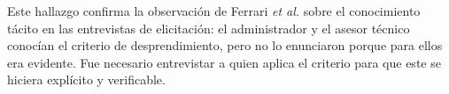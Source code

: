 Este hallazgo confirma la observación de Ferrari \emph{et al.} \cite{ferrari2016} sobre el
conocimiento tácito en las entrevistas de elicitación: el administrador y el asesor técnico conocían
el criterio de desprendimiento, pero no lo enunciaron porque para ellos era evidente. Fue necesario
entrevistar a quien aplica el criterio para que este se hiciera explícito y verificable.
